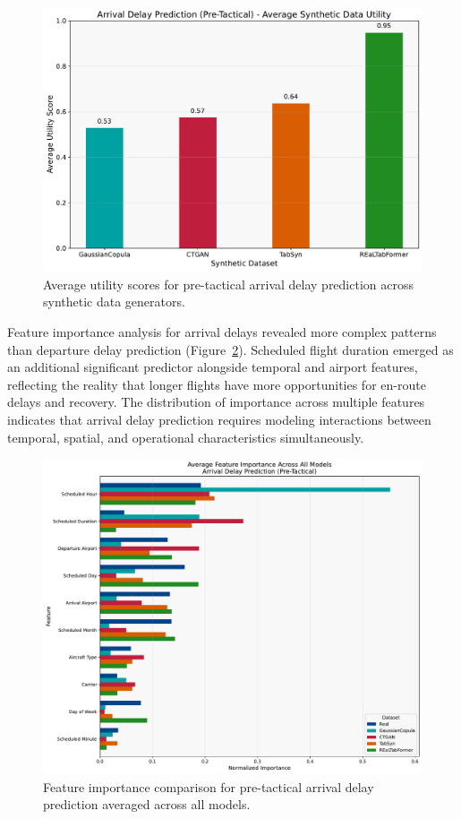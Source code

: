 \documentclass[conference]{IEEEtran}
\begin{document}
\begin{figure}[htbp]
    \centering
    \includegraphics[width=0.8\linewidth]{plots/arrival_delay_min_pre-tactical/arrival_delay_min_pre-tactical_avg_utility.pdf}
    \caption{Average utility scores for pre-tactical arrival delay prediction across synthetic data generators.}
    \label{fig:arrival_pre_utility}
\end{figure}

Feature importance analysis for arrival delays revealed more complex patterns than departure delay prediction (Figure~\ref{fig:arrival_features}). Scheduled flight duration emerged as an additional significant predictor alongside temporal and airport features, reflecting the reality that longer flights have more opportunities for en-route delays and recovery. The distribution of importance across multiple features indicates that arrival delay prediction requires modeling interactions between temporal, spatial, and operational characteristics simultaneously.

\begin{figure}[htbp]
    \centering
    \includegraphics[width=\linewidth]{plots/arrival_delay_min_pre-tactical/feature_importances/arrival_delay_min_pre-tactical_all_models_feature_comparison.pdf}
    \caption{Feature importance comparison for pre-tactical arrival delay prediction averaged across all models.}
    \label{fig:arrival_features}
\end{figure}
\end{document}
